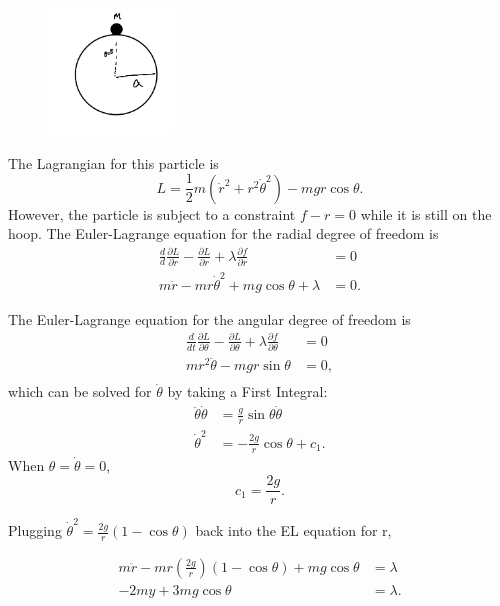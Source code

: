 \documentclass{article}
\begin{document}
\begin{figure}[h!] 
    \centering
    \includegraphics[width=0.3\textwidth]{figures/problem_13.png}
    \label{fig:my_label}
\end{figure}

The Lagrangian for this particle is 
\begin{equation*}
    L = \frac{1}{2}m\left(\dot{r}^2 + r^2 \dot{\theta}^2 \right) - m g r \cos \theta.
\end{equation*}
However, the particle is subject to a constraint $f - r = 0$ while it is still on the hoop. The Euler-Lagrange equation for the radial degree of freedom is 
\begin{align*}
    \frac{d}{d} \frac{\partial L}{\partial \dot r}-\frac{\partial L}{\partial r}+\lambda \frac{\partial f}{\partial r}&=0 \\
    m \ddot{r}-m r \dot{\theta}^{2}+m g \cos \theta+\lambda&=0.
\end{align*}

The Euler-Lagrange equation for the angular degree of freedom is
\begin{align*}
    \frac{d}{d t} \frac{\partial L}{\partial \theta}-\frac{\partial L}{\partial \theta}+\lambda \frac{\partial f}{\partial \theta}&=0\\
    m r^{2} \ddot{\theta}-m g r \sin \theta&=0, \\
\end{align*}
which can be solved for $\dot\theta$ by taking a First Integral:
\begin{align*}
    \ddot{\theta} \dot{\theta}&=\frac{g}{r} \sin \theta \dot{\theta}\\
    \dot{\theta}^{2}&=-\frac{2 g}{r} \cos \theta+c_{1}.
\end{align*}
When $\theta= \dot \theta = 0$, 
\begin{equation*}
    c_1 = \frac{2g}{r}.
\end{equation*}

Plugging $\dot{\theta}^{2}=\frac{2g}{r}(1-\cos \theta)$ back into the EL equation for r, 

\begin{align*}
    m \ddot{r}-m r\left(\frac{2g}{r}\right)(1-\cos \theta)+mg \cos \theta&=\lambda\\
    -2 m y+3 m g \cos \theta&=\lambda.
\end{align*}
\end{document}
